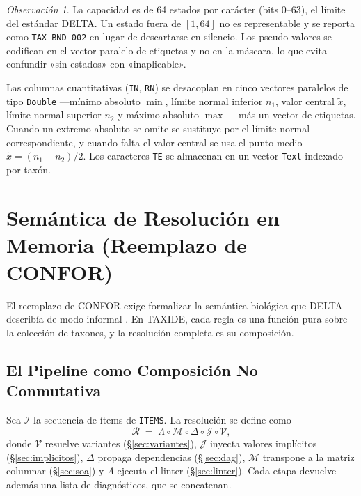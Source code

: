 \documentclass[11pt,a4paper]{article}
\theoremstyle{definition}
\theoremstyle{remark}
\newtheorem*{observacion}{Observación}
\begin{document}
\begin{observacion}
La capacidad es de 64 estados por carácter (bits $0$--$63$), el límite del estándar DELTA. Un estado fuera de $[1,64]$ no es representable y se reporta como \texttt{TAX-BND-002} en lugar de descartarse en silencio. Los pseudo-valores se codifican en el vector paralelo de etiquetas y no en la máscara, lo que evita confundir «sin estados» con «inaplicable».
\end{observacion}

Las columnas cuantitativas (\texttt{IN}, \texttt{RN}) se desacoplan en cinco vectores paralelos de tipo \texttt{Double} ---mínimo absoluto $\min$, límite normal inferior $n_1$, valor central $\tilde{x}$, límite normal superior $n_2$ y máximo absoluto $\max$--- más un vector de etiquetas. Cuando un extremo absoluto se omite se sustituye por el límite normal correspondiente, y cuando falta el valor central se usa el punto medio $\tilde{x} = (n_1+n_2)/2$. Los caracteres \texttt{TE} se almacenan en un vector \texttt{Text} indexado por taxón.

\section{Semántica de Resolución en Memoria (Reemplazo de CONFOR)}
\label{sec:resolucion}

El reemplazo de CONFOR exige formalizar la semántica biológica que DELTA describía de modo informal \cite{dallwitzpaine1986,dallwitz1993}. En TAXIDE, cada regla es una función pura sobre la colección de taxones, y la resolución completa es su composición.

\subsection{El Pipeline como Composición No Conmutativa}
\label{sec:pipeline}
Sea $\mathcal{I}$ la secuencia de ítems de \texttt{ITEMS}. La resolución se define como
\begin{equation}
\label{eq:pipeline}
\mathcal{R} \;=\; \Lambda \circ \mathcal{M} \circ \Delta \circ \mathcal{J} \circ \mathcal{V},
\end{equation}
donde $\mathcal{V}$ resuelve variantes (\S\ref{sec:variantes}), $\mathcal{J}$ inyecta valores implícitos (\S\ref{sec:implicitos}), $\Delta$ propaga dependencias (\S\ref{sec:dag}), $\mathcal{M}$ transpone a la matriz columnar (\S\ref{sec:soa}) y $\Lambda$ ejecuta el linter (\S\ref{sec:linter}). Cada etapa devuelve además una lista de diagnósticos, que se concatenan.
\end{document}
